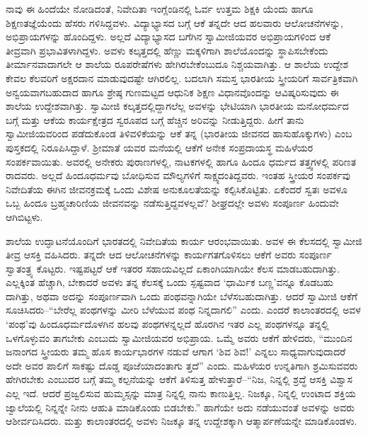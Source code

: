 ನಾವು ಈ ಹಿಂದೆಯೇ ನೋಡಿದಂತೆ, ನಿವೇದಿತಾ ಇಂಗ್ಲೆಂಡಿನಲ್ಲಿ ಓರ್ವ ಉತ್ತಮ ಶಿಕ್ಷಕಿ ಯೆಂದು ಹಾಗೂ ಶಿಕ್ಷಣತಜ್ಞೆಯೆಂದು ಹೆಸರು ಗಳಿಸಿದ್ದವಳು. ವಿದ್ಯಾಭ್ಯಾಸದ ಬಗ್ಗೆ ಆಕೆ ತನ್ನದೇ ಆದ ಹಲವಾರು ಆಲೋಚನೆಗಳನ್ನು, ಅಭಿಪ್ರಾಯಗಳನ್ನು ಹೊಂದಿದ್ದಳು. ಅಲ್ಲದೆ ವಿದ್ಯಾಭ್ಯಾಸದ ಬಗೆಗಿನ ಸ್ವಾಮೀಜಿಯವರ ಅಭಿಪ್ರಾಯಗಳಿಂದ ಆಕೆ ತೀವ್ರವಾಗಿ ಪ್ರಭಾವಿತಳಾಗಿದ್ದಳು. ಅವಳು ಕಲ್ಕತ್ತದಲ್ಲಿ ಹೆಣ್ಣು ಮಕ್ಕಳಿಗಾಗಿ ಶಾಲೆಯೊಂದನ್ನು ಸ್ಥಾಪಿಸಬೇಕೆಂದು ತೀರ್ಮಾನವಾದಾಗಲೇ ಆ ಶಾಲೆಯ ರೂಪರೇಷೆಗಳು ಹೇಗಿರಬೇಕೆಂಬುದೂ ನಿಶ್ಚಯವಾಗಿತ್ತು. ಆ ಶಾಲೆಯ ಉದ್ದೇಶ ಕೇವಲ ಕೆಲವರಿಗೆ ಅಕ್ಷರದಾನ ಮಾಡುವುದಷ್ಟೇ ಆಗಿರಲಿಲ್ಲ. ಬದಲಾಗಿ ಸಮಸ್ತ ಭಾರತೀಯ ಸ್ತ್ರೀಯರಿಗೆ ಸಾರ್ವತ್ರಿಕವಾಗಿ ಅನ್ವಯವಾಗಬಹುದಾದ ಹಾಗೂ ಶ್ರೇಷ್ಠ ಗುಣಮಟ್ಟದ ಆಧುನಿಕ ಶಿಕ್ಷಣ ವಿಧಾನವೊಂದನ್ನು ಆವಿಷ್ಕರಿಸುವುದು ಈ ಶಾಲೆಯ ಉದ್ದೇಶವಾಗಿತ್ತು. ಸ್ವಾಮೀಜಿ ಕಲ್ಕತ್ತದಲ್ಲಿದ್ದಾಗಲೆಲ್ಲ ಅವಳನ್ನು ಭೇಟಿಯಾಗಿ ಭಾರತೀಯ ಮನೋಧರ್ಮದ ಬಗ್ಗೆ ಮತ್ತು ಆಕೆಯ ಕಾರ್ಯಕ್ಷೇತ್ರದ ಸ್ವರೂಪದ ಬಗ್ಗೆ ಹೆಚ್ಚಿನ ಅರಿವನ್ನು ನೀಡುತ್ತಿದ್ದರು. ಹೀಗೆ ತಾನು ಸ್ವಾಮೀಜಿಯವರಿಂದ ಪಡೆದುಕೊಂಡ ತಿಳಿವಳಿಕೆಯನ್ನು ಆಕೆ ತನ್ನ  (ಭಾರತೀಯ ಜೀವನದ ಹಾಸುಹೊಕ್ಕುಗಳು) ಎಂಬ ಪುಸ್ತಕದಲ್ಲಿ ನಿರೂಪಿಸಿದ್ದಾಳೆ. ಶ್ರೀಮಾತೆ ಯವರ ಮನೆಯಲ್ಲಿ ಆಕೆಗೆ ಅನೇಕ ಸಂಪ್ರದಾಯಸ್ಥ ಮಹಿಳೆಯರ ಸಂಪರ್ಕವಾಯಿತು. ಅವರಲ್ಲಿ ಅನೇಕರು ಪುರಾಣಗಳಲ್ಲಿ, ನಾಟಕಗಳಲ್ಲಿ ಹಾಗೂ ಹಿಂದೂ ಧರ್ಮದ ತತ್ತ್ವಗಳಲ್ಲಿ ಪರಿಣತ ರಾದವರು. ಅಲ್ಲದೆ ಹಿಂದೂಧರ್ಮವು ಬೋಧಿಸುವ ಮೌಲ್ಯಗಳಿಗೆ ಸಾಕ್ಷ್ಯದಂತಿದ್ದವರು. ಇಂತಹ ಸ್ತ್ರೀಯರ ಸಂಪರ್ಕವು ನಿವೇದಿತೆಯ ಈಗಿನ ಜೀವನಕ್ರಮಕ್ಕೆ ಒಂದು ವಿಶೇಷ ಅನುಕೂಲತೆಯನ್ನು ಕಲ್ಪಿಸಿಕೊಟ್ಟಿತು. ಏಕೆಂದರೆ ಸ್ವತಃ ಅವಳೂ ಒಬ್ಬ ಹಿಂದೂ ಬ್ರಹ್ಮಚಾರಿಣಿಯ ಜೀವನವನ್ನು ನಡೆಸುತ್ತಿದ್ದವಳಲ್ಲವೆ? ಶೀಘ್ರದಲ್ಲೇ ಅವಳು ಸಂಪೂರ್ಣ ಹಿಂದುವೇ ಆಗಿಬಿಟ್ಟಳು.

ಶಾಲೆಯ ಉದ್ಘಾಟನೆಯೊಂದಿಗೆ ಭಾರತದಲ್ಲಿ ನಿವೇದಿತೆಯ ಕಾರ್ಯ ಆರಂಭವಾಯಿತು. ಅವಳ ಈ ಕೆಲಸದಲ್ಲಿ ಸ್ವಾಮೀಜಿ ತೀವ್ರ ಆಸಕ್ತಿ ವಹಿಸಿದರು. ತನ್ನದೇ ಆದ ಆಲೋಚನೆಗಳನ್ನು ಕಾರ್ಯಗತಗೊಳಿಸಲು ಆಕೆಗೆ ಅವರು ಸಂಪೂರ್ಣ ಸ್ವಾತಂತ್ರ್ಯ ಕೊಟ್ಟರು. ಇಷ್ಟಪಟ್ಟರೆ ಆಕೆ ಇತರರ ಸಹಾಯವಿಲ್ಲದೆ ಏಕಾಂಗಿಯಾಗಿಯೇ ಕೆಲಸ ಮಾಡಬಹುದಾಗಿತ್ತು. ಎಲ್ಲಕ್ಕಿಂತ ಹೆಚ್ಚಾಗಿ, ಬೇಕಾದರೆ ಅವಳು ತನ್ನ ಕೆಲಸಕ್ಕೆ ಒಂದು ಸ್ಪಷ್ಟವಾದ ‘ಧಾರ್ಮಿಕ ಬಣ್ಣ’ವನ್ನೂ ಕೊಡಬಹು ದಾಗಿತ್ತು, ಅಥವಾ ಅದನ್ನು ಸಂಪೂರ್ಣವಾಗಿ ಒಂದು ಪಂಥವನ್ನಾಗಿಯೇ ಬೆಳೆಸಬಹುದಾಗಿತ್ತು. ಆದರೆ ಸ್ವಾಮೀಜಿ ಆಕೆಗೆ ಸೂಚಿಸಿದರು–“ಬೇರೆಲ್ಲ ಪಂಥಗಳನ್ನು ಮೀರಿ ಬೆಳೆಯುವ ಪಂಥ ನಿನ್ನದಾಗಲಿ” ಎಂದು. ಎಂದರೆ ಕಾಲಾಂತರದಲ್ಲಿ ಅವಳ ‘ಪಂಥ’ವು ಹಿಂದೂಧರ್ಮದೊಳಗಿನ ಹಲವು ಪಂಥಗಳನ್ನಲ್ಲದೆ ಹೊರಗಿನ ಇತರ ಎಲ್ಲ ಪಂಥಗಳನ್ನೂ ತನ್ನಲ್ಲಿ ಒಳಗೊಳ್ಳುವಂ ತಾಗಬೇಕು ಎಂಬುದು ಸ್ವಾಮೀಜಿಯವರ ಅಭಿಪ್ರಾಯ. ಒಮ್ಮೆ ಅವರು ಆಕೆಗೆ ಹೇಳಿದರು, “ಮುಂದಿನ ಜನಾಂಗದ ಸ್ತ್ರೀಯರು ತಮ್ಮ ಹೊಸ ಕಾರ್ಯಭಾರಗಳ ನಡುವೆ ಆಗಾಗ ‘ಶಿವ ಶಿವ!’ ಎನ್ನಲು ಸಾಧ್ಯವಾಗುವುದಾದರೆ ಅದೇ ಅವರ ಪಾಲಿಗೆ ಸಾಕಷ್ಟು ದೊಡ್ಡ ಪೂಜೆಯಾದಂತಾಗು ತ್ತದೆ” ಎಂದು. ಮಹಿಳೆಯರ ಉನ್ನತಿಗಾಗಿ ಶ್ರಮಿಸುವವರು ಹೇಗಿರಬೇಕು ಎಂಬುದರ ಬಗ್ಗೆ ತಮ್ಮ ಕಲ್ಪನೆಯನ್ನು ಆಕೆಗೆ ತಿಳಿಸುತ್ತ ಹೇಳುತ್ತಾರೆ–“ನಿಜ, ನಿನ್ನಲ್ಲಿ ಶ್ರದ್ಧೆ ಆಸಕ್ತಿ ವಿಶ್ವಾಸ ಎಲ್ಲ ಇದೆ. ಆದರೆ ಪ್ರಜ್ವಲಿಸುವ ಹುಮ್ಮಸ್ಸನ್ನು ಮಾತ್ರ ನಿನ್ನಲ್ಲಿ ನಾನು ಕಾಣುತ್ತಿಲ್ಲ. ನಿಜಕ್ಕೂ, ನಿನ್ನಲ್ಲಿ ಉಂಟಾದ ಶಕ್ತಿಯ ಜ್ವಾಲೆಯಲ್ಲಿ ನಿನ್ನನ್ನೇ ನೀನು ಆಹುತಿ ಮಾಡಿಕೊಂಡು ಬಿಡಬೇಕು.” ಹಾಗೆಯೇ ಅದು ನಡೆಯುವಂತೆ ಅವಳನ್ನು ಅವರು ಆಶೀರ್ವದಿಸಿದರು. ಮತ್ತು ಕಾಲಾಂತರದಲ್ಲಿ ಅವಳು ನಿಜಕ್ಕೂ ತನ್ನ ಉದ್ದೇಶಕ್ಕಾಗಿ ಆತ್ಮಾರ್ಪಣೆಯನ್ನೇ ಮಾಡಿಕೊಂಡಳು.

